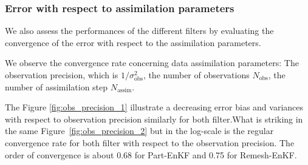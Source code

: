 \newpage

\subsubsection{Error with respect to assimilation parameters}
We also assess the performances of the different filters by evaluating the convergence of the error with respect to the assimilation parameters.

We observe the convergence rate concerning data assimilation parameters: The observation precision, which is \(1/\sigma_{\text{obs}}^2\), the number of observations \(N_{\text{obs}}\), the number of assimilation step \(N_{\text{assim}}\).

The Figure \ref{fig:obs_precision_1} illustrate a decreasing error bias and variances with respect to observation precision similarly for both filter.What is striking in the same Figure~\ref{fig:obs_precision_2} but in the log-scale is the regular convergence rate for both filter with respect to the observation precision. The order of convergence is about 0.68 for Part-EnKF and 0.75 for Remesh-EnKF.

